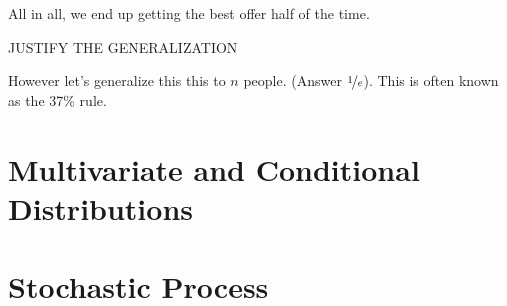 \documentclass{report}
\begin{document}
\\\\

All in all, we end up getting the best offer half of the time.

\todo JUSTIFY THE GENERALIZATION

However let's generalize this this to $n$ people. (Answer $\nicefrac 1e$). This is often known as the 37\% rule. 

\chapter{Multivariate and Conditional Distributions}

\chapter{Stochastic Process}
\end{document}
